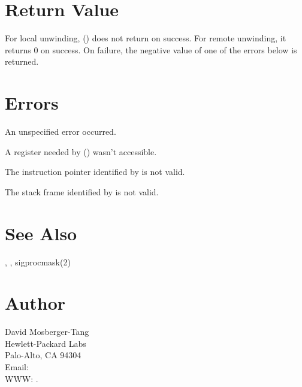 \documentclass{article}
\begin{document}
\section{Return Value}

For local unwinding, () does not return on success.
For remote unwinding, it returns 0 on success.  On failure, the
negative value of one of the errors below is returned.

\section{Errors}

\begin{Description}
\item[\Const{UNW\_EUNSPEC}] An unspecified error occurred.
\item[\Const{UNW\_EBADREG}] A register needed by () wasn't
  accessible.
\item[\Const{UNW\_EINVALIDIP}] The instruction pointer identified by
   is not valid.
\item[\Const{UNW\_BADFRAME}] The stack frame identified by
   is not valid.
\end{Description}

\section{See Also}

,
,
sigprocmask(2)

\section{Author}

\noindent
David Mosberger-Tang\\
Hewlett-Packard Labs\\
Palo-Alto, CA 94304\\
Email: \\
WWW: .
\LatexManEnd
\end{document}
